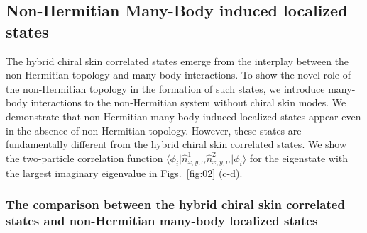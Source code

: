 \documentclass[longbibliography, aps, prx, amsmath, amssymb, amsfonts, twocolumn,superscriptaddress, footinbib]{revtex4-1}
\begin{document}
	\subsection{Non-Hermitian Many-Body induced localized states\label{sec:NHMBL}}

	The hybrid chiral skin correlated states emerge from the interplay between the non-Hermitian topology and many-body interactions. To show the novel role of the non-Hermitian topology in the formation of such states, we introduce many-body interactions to the non-Hermitian system without chiral skin modes.
	We demonstrate that non-Hermitian many-body induced localized states appear even in the absence of non-Hermitian topology. However, these states are fundamentally different from the hybrid chiral skin correlated states.
    We show the two-particle correlation function $\langle \phi_i \vert \hat{n}^1_{x,y,\alpha} \hat{n}^2_{x,y,\alpha} \vert \phi_i \rangle$ for the eigenstate with the largest imaginary eigenvalue in Figs.~\ref{fig:02} (c-d).

	\subsubsection{The comparison between the hybrid chiral skin correlated states and non-Hermitian many-body localized states~\label{sec:appendixE_comp}}
    
\end{document}
